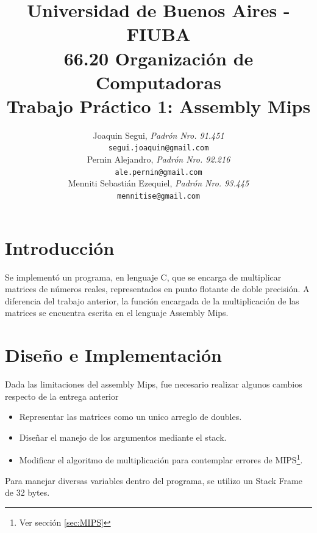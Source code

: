 \documentclass[10pt,a4paper]{article}
\title{Universidad de Buenos Aires - FIUBA \\
		66.20 Organización de Computadoras \\
		Trabajo Práctico 1: Assembly Mips\\}
\author{	Joaquin Segui, \textit{Padrón Nro. 91.451}                     \\
            \texttt{ segui.joaquin@gmail.com }                                          \\[2.5ex]
            Pernin Alejandro, \textit{Padrón Nro. 92.216}                     \\
            \texttt{ale.pernin@gmail.com}                                              \\[2.5ex]
            Menniti Sebastián Ezequiel, \textit{Padrón Nro. 93.445}                     \\
            \texttt{ mennitise@gmail.com }                                              \\[2.5ex]}
\date{}
\begin{document}
%


\maketitle\thispagestyle{empty}

\newpage\null\thispagestyle{empty}%



\section{Introducción}

Se implementó un programa, en lenguaje C, que se encarga de multiplicar matrices de números reales, representados en punto flotante de doble precisión. A diferencia del trabajo anterior, la función encargada de la multiplicación de las matrices se encuentra escrita en el lenguaje Assembly Mips.


\section{Diseño e Implementación}

Dada las limitaciones del assembly Mips, fue necesario realizar algunos cambios respecto de la entrega anterior

\begin{itemize}
	\item Representar las matrices como un unico arreglo de doubles.
	\item Diseñar el manejo de los argumentos mediante el stack.
	\item Modificar el algoritmo de multiplicación para contemplar errores de MIPS\footnote{Ver sección \ref{sec:MIPS}}.
\end{itemize}

Para manejar diversas variables dentro del programa, se utilizo un Stack Frame de 32 bytes.
\end{document}
